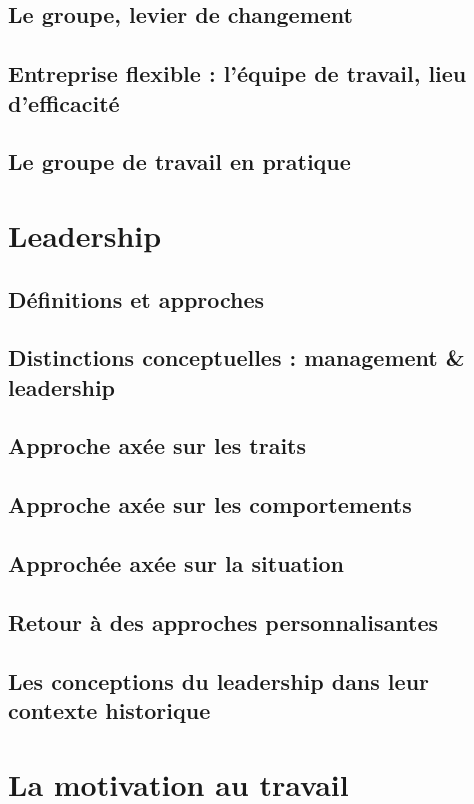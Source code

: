\documentclass[12pt]{article}
\begin{document}
	\subsection{Le groupe, levier de changement}
	\subsection{Entreprise flexible : l’équipe de travail, lieu d’efficacité}
	\subsection{Le groupe de travail en pratique}
		
\section{Leadership}
	\subsection{Définitions et approches}
	\subsection{Distinctions conceptuelles : management \& leadership}
	\subsection{Approche axée sur les traits}
	\subsection{Approche axée sur les comportements}
	\subsection{Approchée axée sur la situation}
	\subsection{Retour à des approches personnalisantes}
	\subsection{Les conceptions du leadership dans leur contexte historique}

\section{La motivation au travail}
\end{document}
